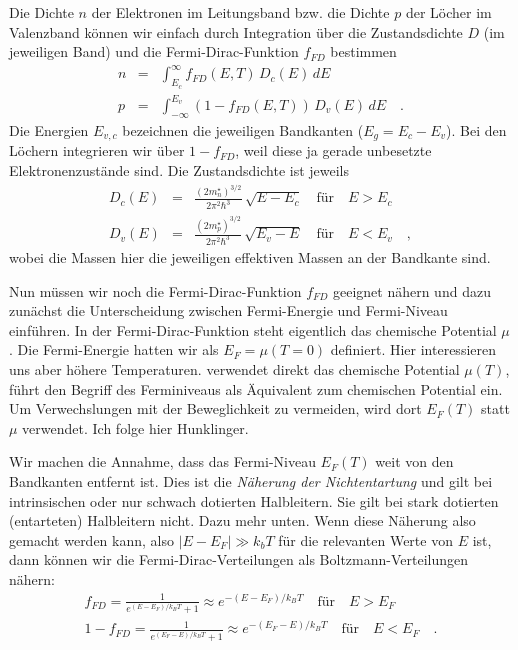 Die Dichte $n$ der Elektronen im Leitungsband bzw. die Dichte $p$ der Löcher im Valenzband können wir einfach durch Integration über die Zustandsdichte $D$ (im jeweiligen Band) und die Fermi-Dirac-Funktion $f_{FD}$ bestimmen
\begin{eqnarray}
    n &= & \int_{E_c}^\infty f_{FD}(E,T) \, D_c(E) \, dE \\
    p &= & \int_{-\infty}^{E_v} (1 - f_{FD}(E,T)) \, D_v(E) \, dE  \quad .
\end{eqnarray}
Die Energien $E_{v,c}$ bezeichnen die jeweiligen Bandkanten ($E_g = E_c - E_v$). Bei den Löchern integrieren wir über $1-f_{FD}$, weil diese ja gerade unbesetzte Elektronenzustände sind. Die Zustandsdichte ist jeweils
\begin{eqnarray}
    D_c(E) &= & \frac{ (2 m^\star_n)^{3/2} } {2 \pi^2 \hbar^3} \, \sqrt{E - E_c}   \quad \text{für} \quad E > E_c \\
    D_v(E) &= & \frac{ (2 m^\star_p)^{3/2} } {2 \pi^2 \hbar^3} \, \sqrt{E_v - E} \quad \text{für} \quad E < E_v \quad ,
\end{eqnarray}
wobei die Massen hier die jeweiligen effektiven Massen an der Bandkante sind.

Nun müssen wir noch die Fermi-Dirac-Funktion $f_{FD}$ geeignet nähern und dazu zunächst die Unterscheidung zwischen Fermi-Energie und Fermi-Niveau einführen. In der Fermi-Dirac-Funktion steht eigentlich das chemische Potential $\mu$. Die Fermi-Energie hatten wir als $E_F = \mu(T=0)$ definiert. Hier interessieren uns aber höhere Temperaturen. \cite{Gross_FK} verwendet direkt das chemische Potential $\mu(T)$, \cite{Hunklinger2014} führt den Begriff des Ferminiveaus als Äquivalent zum chemischen Potential ein. Um Verwechslungen mit der Beweglichkeit zu vermeiden, wird dort $E_F(T)$ statt $\mu$ verwendet. Ich folge hier Hunklinger.

Wir machen die Annahme, dass das Fermi-Niveau $E_F(T)$ weit von den Bandkanten entfernt ist. Dies ist die \emph{Näherung der Nichtentartung} und gilt bei intrinsischen oder nur schwach dotierten Halbleitern. Sie gilt bei stark dotierten (entarteten)  Halbleitern nicht. Dazu mehr unten. Wenn diese Näherung also gemacht werden kann, also $|E - E_F| \gg k_b T$ für die relevanten Werte von $E$ ist, dann können wir die Fermi-Dirac-Verteilungen als Boltzmann-Verteilungen nähern:
\begin{eqnarray}
    f_{FD} = \frac{1}{e^{ (E- E_F) / k_B T} +1 } \approx e^{ -(E- E_F) / k_B T}  \quad \text{für} \quad E > E_F \\
  1-  f_{FD} = \frac{1}{e^{ (E_F - E) / k_B T} +1 } \approx e^{ -(E_F - E) / k_B T}  \quad \text{für} \quad E < E_F  \quad .
\end{eqnarray}

